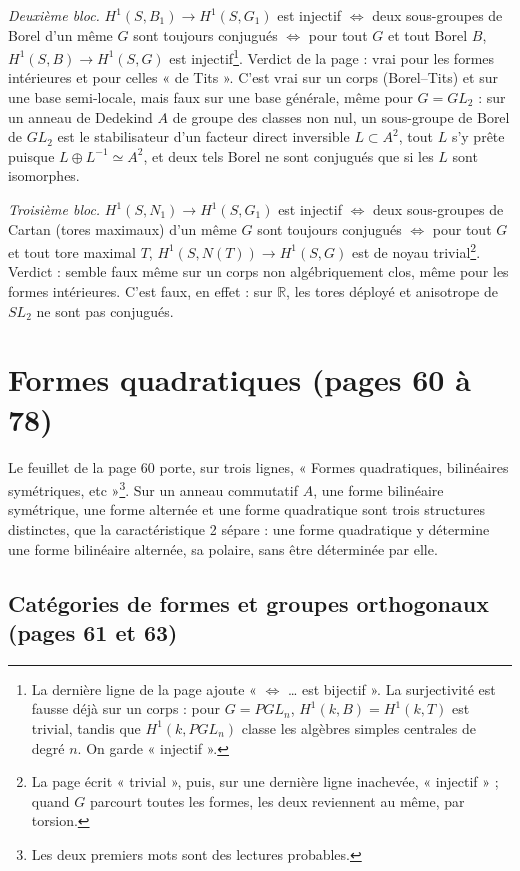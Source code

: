 \documentclass[11pt,a4paper]{article}
\begin{document}
\emph{Deuxième bloc.} $H^1(S,B_1) \to H^1(S,G_1)$ est injectif $\Leftrightarrow$ deux
sous-groupes de Borel d'un même $G$ sont toujours conjugués $\Leftrightarrow$ pour
tout $G$ et tout Borel $B$, $H^1(S,B) \to H^1(S,G)$ est injectif\footnote{La
dernière ligne de la page ajoute « $\Leftrightarrow$ … est bijectif ». La
surjectivité est fausse déjà sur un corps : pour $G = PGL_n$, $H^1(k,B) =
H^1(k,T)$ est trivial, tandis que $H^1(k,PGL_n)$ classe les algèbres simples
centrales de degré $n$. On garde « injectif ».}. Verdict de la page : vrai pour
les formes intérieures et pour celles « de Tits ». C'est vrai sur un corps
(Borel--Tits) et sur une base semi-locale, mais faux sur une base générale, même
pour $G = GL_2$ : sur un anneau de Dedekind $A$ de groupe des classes non nul, un
sous-groupe de Borel de $GL_2$ est le stabilisateur d'un facteur direct
inversible $L \subset A^2$, tout $L$ s'y prête puisque $L \oplus L^{-1} \simeq A^2$,
et deux tels Borel ne sont conjugués que si les $L$ sont isomorphes.

\emph{Troisième bloc.} $H^1(S,N_1) \to H^1(S,G_1)$ est injectif $\Leftrightarrow$ deux
sous-groupes de Cartan (tores maximaux) d'un même $G$ sont toujours conjugués
$\Leftrightarrow$ pour tout $G$ et tout tore maximal $T$, $H^1(S,N(T)) \to H^1(S,G)$
est de noyau trivial\footnote{La page écrit « trivial », puis, sur une dernière
ligne inachevée, « injectif » ; quand $G$ parcourt toutes les formes, les deux
reviennent au même, par torsion.}. Verdict : semble faux même sur un corps non algébriquement clos,
même pour les formes intérieures. C'est faux, en effet : sur $\mathbb{R}$, les
tores déployé et anisotrope de $SL_2$ ne sont pas conjugués.

\section*{Formes quadratiques (pages 60 à 78)}

Le feuillet de la page 60 porte, sur trois lignes, « Formes quadratiques,
bilinéaires symétriques, etc »\footnote{Les deux premiers mots sont des lectures
probables.}. Sur un anneau commutatif $A$, une forme bilinéaire symétrique, une
forme alternée et une forme quadratique sont trois structures distinctes, que
la caractéristique 2 sépare : une forme quadratique y détermine une forme
bilinéaire alternée, sa polaire, sans être déterminée par elle.

\subsection*{Catégories de formes et groupes orthogonaux (pages 61 et 63)}
\end{document}
